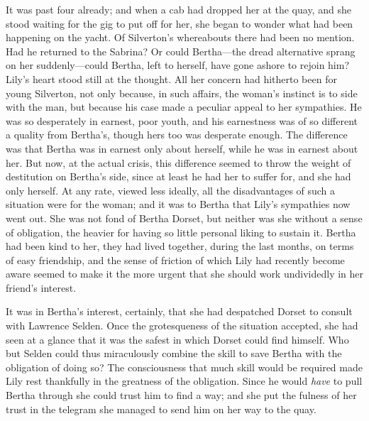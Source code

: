 \documentclass[12pt,a4paper]{book}
\begin{document}
It was past four already; and when a cab had dropped her at the
quay, and she stood waiting for the gig to put off for her, she
began to wonder what had been happening on the yacht. Of
Silverton's whereabouts there had been no mention. Had he
returned to the Sabrina? Or could Bertha---the dread alternative
sprang on her suddenly---could Bertha, left to herself, have gone
ashore to rejoin him? Lily's heart stood still at the thought. 
All her concern had hitherto been for young Silverton, not only
because, in such affairs, the woman's instinct is to side with
the man, but because his case made a peculiar appeal to her
sympathies. He was so desperately in earnest, poor youth, and his
earnestness was of so different a quality from Bertha's, though
hers too was desperate enough. The difference was that Bertha was
in earnest only about herself, while he was in earnest about her. 
But now, at the actual crisis, this difference seemed to throw
the weight of destitution on Bertha's side, since at least he had
her to suffer for, and she had only herself. At any rate, viewed
less ideally, all the disadvantages of such a situation were for
the woman; and it was to Bertha that Lily's sympathies now went
out. She was not fond of Bertha Dorset, but neither was she
without a sense of obligation, the heavier for having so little
personal liking to sustain it. Bertha had been kind to her, they
had lived together, during the last months, on terms of easy
friendship, and the sense of friction of which Lily had recently
become aware seemed to make it the more urgent that she should
work undividedly in her friend's interest.





It was in Bertha's interest, certainly, that she had despatched
Dorset to consult with Lawrence Selden. Once the grotesqueness of
the situation accepted, she had seen at a glance that it was the
safest in which Dorset could find himself. Who but Selden could
thus miraculously combine the skill to save Bertha with the
obligation of doing so? The consciousness that much skill would
be required made Lily rest thankfully in the greatness of the
obligation. Since he would \textit{have} to pull Bertha through she could
trust him to find a way; and she put the fulness of her trust in
the telegram she managed to send him on her way to the quay.
\end{document}
